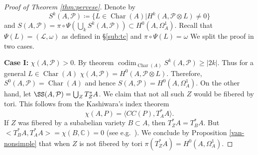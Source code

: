 \documentclass[11pt,reqno]{amsart}
\theoremstyle{definition}
\theoremstyle{remark}
\theoremstyle{cited}
\theoremstyle{citeddef}
\DeclareMathOperator{\codim}{codim}              %
\DeclareMathOperator{\Char}{Char}
\newcommand{\sL}{\mathcal{L}}
\newcommand{\sP}{\mathcal{P}}
\newcommand{\bbC}{\mathbb{C}}
\begin{document}
\begin{proof}[Proof of Theorem \ref{thm:pervese}]
Denote by
\[S^k(A,\sP)\coloneqq \{L\in \Char(A)| H^k(A, \sP\otimes L) \neq 0\}\]
and $S(A,\sP) = \pi\circ\Psi(\bigcup_k S^k(A,\sP))\subset H^0(A,\Omega_A^1)$. Recall that $\Psi(L) = (\sL, \omega)$
as defined in \S \ref{sub:tc} and $\pi\circ\Psi(L) = \omega$
We split the proof in two cases.

\noindent \textbf{Case I: }$\chi(A, \sP)>0$. By theorem \cite[Theorem 7.4]{sch}
$\codim_{\Char(A)} S^k(A,\sP) \geq |2k|$. Thus for a general $L \in \Char(A)$
$\chi(A, \sP) = H^0(A, \sP\otimes L)$. Therefore, $S^0(A,\sP) = \Char(A)$ and hence $S(A, \sP) = H^0(A, \Omega_A^1)$.
On the other hand, let $\SS(A, \sP) = \bigcup_Z T^*_ZA$. We claim that not all such $Z$ would be fibered by tori. This follows from
the Kashiwara's index theorem 
\[\chi(A,P) = \langle CC(P), T^*_AA\rangle.\]
If $Z$ was fibered by a subabelian variety $B\subset A$, then $T^*_ZA = T^*_BA$. But $<T^*_BA, T^*_AA> = \chi(B, \bbC) = 0$ (see e.g.\ \cite[p.\ 124]{Dim}).
We conclude by Proposition \ref{van-nonsimple} that when $Z$ is not fibered by tori $\pi(T^*_ZA) = H^0(A,\Omega_A^1)$. 


\end{proof}
\end{document}
